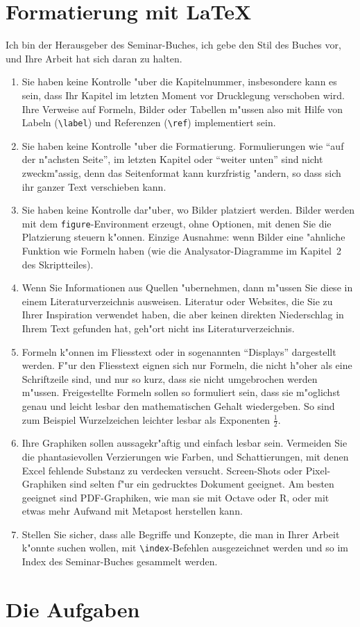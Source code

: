 \documentclass[a4paper]{article}
\begin{document}
\section{Formatierung mit \LaTeX}
Ich bin der Herausgeber des Seminar-Buches, ich gebe den Stil des
Buches vor, und Ihre Arbeit hat sich daran zu halten. 
\begin{enumerate}
\item
Sie haben keine Kontrolle "uber die Kapitelnummer, insbesondere
kann es sein, dass Ihr Kapitel im letzten Moment vor Drucklegung
verschoben wird.
Ihre Verweise auf Formeln, Bilder oder Tabellen m"ussen also mit Hilfe
von Labeln (\verb+\label+) und Referenzen (\verb+\ref+) implementiert
sein.
\item
Sie haben keine Kontrolle "uber die Formatierung.
Formulierungen wie ``auf der n"achsten Seite'', im letzten Kapitel
 oder ``weiter unten'' 
sind nicht zweckm"assig, denn das Seitenformat kann kurzfristig
"andern, so dass sich ihr ganzer Text verschieben kann.
\item
Sie haben keine Kontrolle dar"uber, wo Bilder platziert werden.
Bilder werden mit dem \texttt{figure}-Environment erzeugt, ohne
Optionen, mit denen Sie die Platzierung steuern k"onnen.
Einzige Ausnahme: wenn Bilder eine "ahnliche Funktion wie Formeln haben
(wie die Analysator-Diagramme im Kapitel~2 des Skriptteiles).
\item
Wenn Sie Informationen aus Quellen "ubernehmen, dann m"ussen Sie
diese in einem Literaturverzeichnis ausweisen.
Literatur oder Websites, die Sie zu Ihrer Inspiration verwendet haben,
die aber keinen direkten Niederschlag in Ihrem Text gefunden hat,
geh"ort nicht ins Literaturverzeichnis.
\item
Formeln k"onnen im Fliesstext oder in sogenannten ``Displays'' 
dargestellt werden.
F"ur den Fliesstext eignen sich nur Formeln, die nicht h"oher als
eine Schriftzeile sind, und nur so kurz, dass sie nicht umgebrochen
werden m"ussen.
Freigestellte Formeln sollen so formuliert sein, dass sie m"oglichst
genau und leicht lesbar den mathematischen Gehalt wiedergeben.
So sind zum Beispiel Wurzelzeichen leichter lesbar als Exponenten $\frac12$.
\item
Ihre Graphiken sollen aussagekr"aftig und einfach lesbar sein. 
Vermeiden Sie die phantasievollen Verzierungen wie Farben,
und Schattierungen, mit denen Excel fehlende Substanz zu verdecken
versucht.
Screen-Shots oder Pixel-Graphiken sind selten f"ur ein gedrucktes
Dokument geeignet.
Am besten geeignet sind PDF-Graphiken, wie man sie mit Octave oder
R, oder mit etwas mehr Aufwand mit Metapost herstellen kann.
\item
Stellen Sie sicher, dass alle Begriffe und Konzepte, die man in Ihrer
Arbeit k"onnte suchen wollen, mit \verb+\index+-Befehlen ausgezeichnet
werden und so im Index des Seminar-Buches gesammelt werden.
\end{enumerate}

\section{Die Aufgaben}

\end{document}
